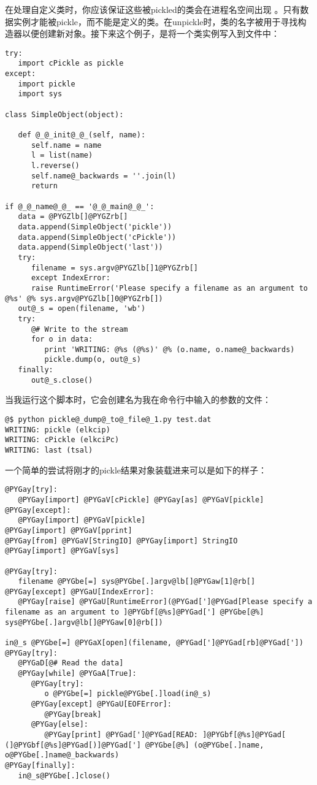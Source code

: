 \documentclass[a4paper,10pt,english]{manual}
\begin{document}
在处理自定义类时，你应该保证这些被pickled的类会在进程名空间出现 。只有数据实例才能被pickle，而不能是定义的类。在unpickle时，类的名字被用于寻找构造器以便创建新对象。接下来这个例子，是将一个类实例写入到文件中：

\begin{Verbatim}[commandchars=@\[\]]
try:
   import cPickle as pickle
except:
   import pickle
   import sys

class SimpleObject(object):

   def @_@_init@_@_(self, name):
      self.name = name
      l = list(name)
      l.reverse()
      self.name@_backwards = ''.join(l)
      return

if @_@_name@_@_ == '@_@_main@_@_':
   data = @PYGZlb[]@PYGZrb[]
   data.append(SimpleObject('pickle'))
   data.append(SimpleObject('cPickle'))
   data.append(SimpleObject('last'))
   try:
      filename = sys.argv@PYGZlb[]1@PYGZrb[]
      except IndexError:
      raise RuntimeError('Please specify a filename as an argument to @%s' @% sys.argv@PYGZlb[]0@PYGZrb[])
   out@_s = open(filename, 'wb')
   try:
      @# Write to the stream
      for o in data:
         print 'WRITING: @%s (@%s)' @% (o.name, o.name@_backwards)
         pickle.dump(o, out@_s)
   finally:
      out@_s.close()
\end{Verbatim}

当我运行这个脚本时，它会创建名为我在命令行中输入的参数的文件：

\begin{Verbatim}[commandchars=@\[\]]
@$ python pickle@_dump@_to@_file@_1.py test.dat
WRITING: pickle (elkcip)
WRITING: cPickle (elkciPc)
WRITING: last (tsal)
\end{Verbatim}

一个简单的尝试将刚才的pickle结果对象装载进来可以是如下的样子：

\begin{Verbatim}[commandchars=@\[\]]
@PYGay[try]:
   @PYGay[import] @PYGaV[cPickle] @PYGay[as] @PYGaV[pickle]
@PYGay[except]:
   @PYGay[import] @PYGaV[pickle]
@PYGay[import] @PYGaV[pprint]
@PYGay[from] @PYGaV[StringIO] @PYGay[import] StringIO
@PYGay[import] @PYGaV[sys]

@PYGay[try]:
   filename @PYGbe[=] sys@PYGbe[.]argv@lb[]@PYGaw[1]@rb[]
@PYGay[except] @PYGaU[IndexError]:
   @PYGay[raise] @PYGaU[RuntimeError](@PYGad[']@PYGad[Please specify a filename as an argument to ]@PYGbf[@%s]@PYGad['] @PYGbe[@%] sys@PYGbe[.]argv@lb[]@PYGaw[0]@rb[])

in@_s @PYGbe[=] @PYGaX[open](filename, @PYGad[']@PYGad[rb]@PYGad['])
@PYGay[try]:
   @PYGaD[@# Read the data]
   @PYGay[while] @PYGaA[True]:
      @PYGay[try]:
         o @PYGbe[=] pickle@PYGbe[.]load(in@_s)
      @PYGay[except] @PYGaU[EOFError]:
         @PYGay[break]
      @PYGay[else]:
         @PYGay[print] @PYGad[']@PYGad[READ: ]@PYGbf[@%s]@PYGad[ (]@PYGbf[@%s]@PYGad[)]@PYGad['] @PYGbe[@%] (o@PYGbe[.]name, o@PYGbe[.]name@_backwards)
@PYGay[finally]:
   in@_s@PYGbe[.]close()
\end{Verbatim}
\end{document}
